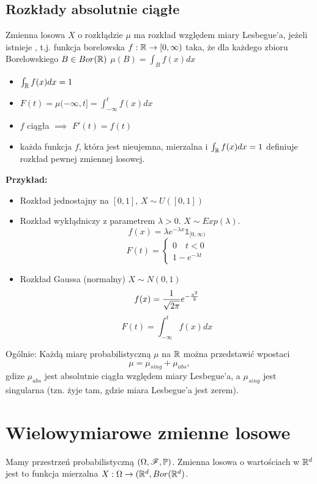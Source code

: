 \subsection{Rozkłady absolutnie ciągłe}

\begin{definicja}
Zmienna losowa $X$ o rozkłądzie $\mu$ ma rozkład  względem miary Lesbegue'a, jeżeli istnieje , t.j. funkcja borelowska $f:\mathbb{R}\to[0,\infty)$ taka, że dla każdego zbioru Borelowskiego $B\in Bor(\mathbb{R})$ $\mu(B)=\int_Bf(x)dx$
\end{definicja}

\begin{itemize}
    \item $\int_{\mathbb{R}} f(x)dx=1$
    \item $F(t)=\mu(-\infty,t]=\int_{-\infty}^tf(x)dx$
    \item $f$ ciągła $\implies$ $F'(t)=f(t)$
    \item każda funkcja $f$, która jest nieujemna, mierzalna i $\int_{\mathbb{R}} f(x)dx=1$ definiuje rozkład pewnej zmiennej losowej.
\end{itemize}

\textbf{Przykład:}
\begin{itemize}
    \item Rozkład jednostajny na $[0,1]$, $X\sim U([0,1])$
    \item Rozkład wykłądniczy z parametrem $\lambda>0$. $X\sim Exp(\lambda)$. 
    $$f(x)=\lambda e^{-\lambda x}\mathbb{1}_{[0,\infty)}$$
    $$F(t)=\begin{cases}0\quad t<0\\1-e^{-\lambda t}\end{cases}$$
    \item Rozkład Gaussa (normalny) $X\sim N(0, 1)$
    $$f(x)={1\over\sqrt{2\pi}}e^{-\frac{x^2}{2}}$$
    $$F(t)=\int_{-\infty}^tf(x)dx$$
\end{itemize}

Ogólnie: Każdą miarę probabilistyczną $\mu$ na $\mathbb{R}$ można przedstawić wpostaci
$$\mu=\mu_{sing}+\mu_{abs},$$
gdize $\mu_{abs}$ jest absolutnie ciągła względem miary Lesbegue'a, a $\mu_{sing}$ jest singularna (tzn. żyje tam, gdzie miara Lesbegue'a jest zerem).

\section{Wielowymiarowe zmienne losowe}
\begin{definicja}
Mamy przestrzeń probabilistyczną $(\Omega,\mathcal{F},\mathbb{P})$. Zmienna losowa o wartościach w $\mathbb{R}^d$ jest to funkcja mierzalna $X:\Omega\to(\mathbb{R}^d,Bor(\mathbb{R}^d)$.
\end{definicja}

